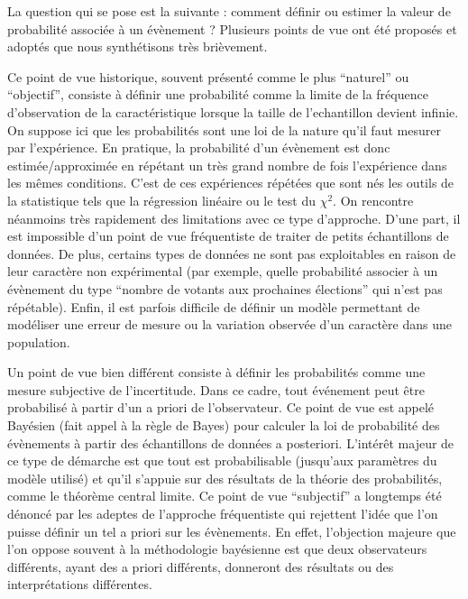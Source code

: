 \documentclass[letterpaper,10pt,english]{jupyterBook}
\begin{document}
\sphinxAtStartPar
La question qui se pose est la suivante : comment définir ou estimer la valeur de probabilité associée à un  évènement ?
Plusieurs points de vue ont été proposés et adoptés que nous synthétisons très brièvement.

\begin{DUlineblock}{0em}
\item[] 
\end{DUlineblock}

\sphinxAtStartPar
Ce point de vue historique, souvent présenté comme le plus “naturel” ou “objectif”, consiste à définir une probabilité comme la limite de la fréquence d’observation de la caractéristique lorsque la taille de l’echantillon devient infinie. On suppose ici que les probabilités sont une loi de la nature qu’il faut mesurer par l’expérience. En pratique, la probabilité d’un  évènement est donc estimée/approximée en répétant un très grand nombre de fois l’expérience dans les mêmes conditions. C’est de ces expériences répétées que sont nés les outils de la statistique tels que la régression linéaire ou le test du \(\chi^2\).
On rencontre néanmoins très rapidement des limitations avec ce type d’approche. D’une part, il est impossible d’un point de vue fréquentiste de traiter de petits échantillons de données. De plus, certains types de données ne sont
pas exploitables en raison de leur caractère non expérimental (par exemple, quelle probabilité associer à un évènement du type “nombre de votants aux prochaines élections” qui n’est pas répétable). Enfin, il est parfois difficile de définir un modèle  permettant de modéliser une erreur de mesure ou la variation observée d’un caractère dans une population.

\begin{DUlineblock}{0em}
\item[] 
\end{DUlineblock}

\begin{sphinxShadowBox}

\sphinxAtStartPar
{}
\end{sphinxShadowBox}

\sphinxAtStartPar
Un point de vue bien différent consiste à définir les probabilités comme une mesure subjective de l’incertitude. Dans ce cadre, tout événement peut être probabilisé à partir d’un a priori de l’observateur. Ce point de vue est appelé Bayésien (fait appel à la règle de Bayes) pour calculer la loi de probabilité des évènements à partir des échantillons de données a posteriori. L’intérêt majeur de ce type de démarche est que tout est probabilisable (jusqu’aux paramètres du modèle utilisé) et qu’il s’appuie sur des résultats de la théorie des probabilités, comme le théorème central limite.
Ce point de vue “subjectif” a longtemps été dénoncé par les adeptes de l’approche fréquentiste qui rejettent l’idée que l’on puisse définir un tel a priori sur les évènements. En effet, l’objection majeure que l’on oppose souvent à la méthodologie bayésienne est que deux observateurs différents, ayant des a priori différents, donneront des résultats ou des interprétations différentes.
\end{document}
